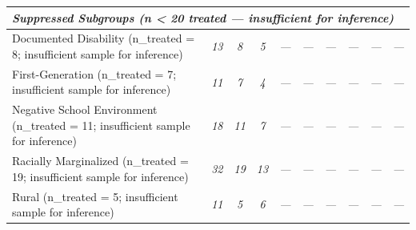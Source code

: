 \begin{table}[t]
\begin{tabular*}{\linewidth}{@{\extracolsep{\fill}}l|ccccccccc}
\multicolumn{10}{l}{{\itshape \textbf{Suppressed Subgroups} \emph{(n \textless{} 20 treated --- insufficient for inference)}}} \\[2.5pt] 
\midrule\addlinespace[2.5pt]
Documented Disability (n\_treated = 8; insufficient sample for inference) & {\itshape \textcolor[HTML]{7F7F7F}{13}} & {\itshape \textcolor[HTML]{7F7F7F}{8}} & {\itshape \textcolor[HTML]{7F7F7F}{5}} & {\itshape \textcolor[HTML]{7F7F7F}{—}} & {\itshape \textcolor[HTML]{7F7F7F}{—}} & {\itshape \textcolor[HTML]{7F7F7F}{—}} & {\itshape \textcolor[HTML]{7F7F7F}{—}} & {\itshape \textcolor[HTML]{7F7F7F}{—}} & {\itshape \textcolor[HTML]{7F7F7F}{—}} \\ 
First-Generation (n\_treated = 7; insufficient sample for inference) & {\itshape \textcolor[HTML]{7F7F7F}{11}} & {\itshape \textcolor[HTML]{7F7F7F}{7}} & {\itshape \textcolor[HTML]{7F7F7F}{4}} & {\itshape \textcolor[HTML]{7F7F7F}{—}} & {\itshape \textcolor[HTML]{7F7F7F}{—}} & {\itshape \textcolor[HTML]{7F7F7F}{—}} & {\itshape \textcolor[HTML]{7F7F7F}{—}} & {\itshape \textcolor[HTML]{7F7F7F}{—}} & {\itshape \textcolor[HTML]{7F7F7F}{—}} \\ 
Negative School Environment (n\_treated = 11; insufficient sample for inference) & {\itshape \textcolor[HTML]{7F7F7F}{18}} & {\itshape \textcolor[HTML]{7F7F7F}{11}} & {\itshape \textcolor[HTML]{7F7F7F}{7}} & {\itshape \textcolor[HTML]{7F7F7F}{—}} & {\itshape \textcolor[HTML]{7F7F7F}{—}} & {\itshape \textcolor[HTML]{7F7F7F}{—}} & {\itshape \textcolor[HTML]{7F7F7F}{—}} & {\itshape \textcolor[HTML]{7F7F7F}{—}} & {\itshape \textcolor[HTML]{7F7F7F}{—}} \\ 
Racially Marginalized (n\_treated = 19; insufficient sample for inference) & {\itshape \textcolor[HTML]{7F7F7F}{32}} & {\itshape \textcolor[HTML]{7F7F7F}{19}} & {\itshape \textcolor[HTML]{7F7F7F}{13}} & {\itshape \textcolor[HTML]{7F7F7F}{—}} & {\itshape \textcolor[HTML]{7F7F7F}{—}} & {\itshape \textcolor[HTML]{7F7F7F}{—}} & {\itshape \textcolor[HTML]{7F7F7F}{—}} & {\itshape \textcolor[HTML]{7F7F7F}{—}} & {\itshape \textcolor[HTML]{7F7F7F}{—}} \\ 
Rural (n\_treated = 5; insufficient sample for inference) & {\itshape \textcolor[HTML]{7F7F7F}{11}} & {\itshape \textcolor[HTML]{7F7F7F}{5}} & {\itshape \textcolor[HTML]{7F7F7F}{6}} & {\itshape \textcolor[HTML]{7F7F7F}{—}} & {\itshape \textcolor[HTML]{7F7F7F}{—}} & {\itshape \textcolor[HTML]{7F7F7F}{—}} & {\itshape \textcolor[HTML]{7F7F7F}{—}} & {\itshape \textcolor[HTML]{7F7F7F}{—}} & {\itshape \textcolor[HTML]{7F7F7F}{—}} \\ 

\end{tabular*}
\end{table}
